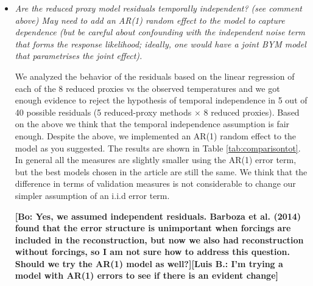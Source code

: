 \documentclass[11pt]{article}
\newcommand{\lb}[1]{\color{ForestGreen}\textbf{[Luis B.: #1]}\normalcolor}
\newcommand{\bl}[1]{\color{red}\textbf{[Bo: #1]}\normalcolor}
\begin{document}
\begin{itemize}
\item \textit{Are the reduced proxy model residuals temporally independent? (see
  comment above) May need to add an AR(1) random effect to the model to capture
  dependence (but be careful about confounding with the independent
  noise term that forms the response likelihood; ideally, one would
  have a joint BYM model that parametrises the joint effect).}

We analyzed the behavior of the residuals based on the linear regression of
each of the 8 reduced proxies vs the observed temperatures and we got enough
evidence to reject the hypothesis of temporal independence in 5 out of 40
possible residuals (5 reduced-proxy methods $\times$ 8 reduced proxies). Based
on the above we think that the temporal independence assumption is fair enough.
Despite the above, we implemented an AR(1) random effect to the model as you
suggested. The results are shown in Table \ref{tab:comparisontot}. In general
all the measures are slightly smaller using the AR(1) error term, but the best
models chosen in the article are still the same. We think that the difference in
terms of validation measures is not considerable to change our simpler
assumption of an i.i.d error term.   

\bl{Yes, we assumed independent residuals. Barboza et al. (2014) found that the
  error structure is unimportant when forcings are included in the
  reconstruction, but now we also had reconstruction without forcings, so I am
  not sure how to address this question. Should we try the AR(1) model as
  well?}\lb{I'm trying a model with AR(1) errors to see if there is an
  evident change}


\end{itemize}
\end{document}

